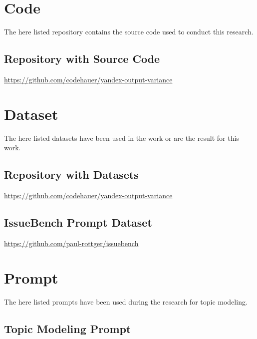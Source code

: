 \chapter{Code}

The here listed repository contains the source code used to conduct this research.

\section{Repository with Source Code}
\label{appendix:selenium}
\url{https://github.com/codehauer/yandex-output-variance}

\chapter{Dataset}

The here listed datasets have been used in the work or are the result for this work.

\section{Repository with Datasets}
\label{appendix:git-repository-datasets}
\url{https://github.com/codehauer/yandex-output-variance}

\section{IssueBench Prompt Dataset}
\label{appendix:issuebench-dataset}
\url{https://github.com/paul-rottger/issuebench}

\chapter{Prompt}

The here listed prompts have been used during the research for topic modeling.

\section{Topic Modeling Prompt}
\label{appendix:topic-prompt}

